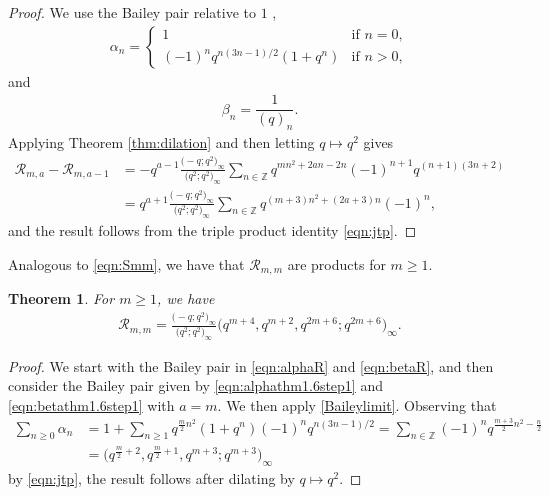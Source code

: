 \documentclass[pdftex]{sigma}
\newtheorem{Theorem}{Theorem}[section]
\numberwithin{equation}{section}
\newcommand{\ZZ}{\mathbb{Z}}
\begin{document}
\begin{proof}
We use the Bailey pair relative to $1$ \cite[p.~468, B(1)]{Sl1},
\begin{align}
	\alpha_n=
	\begin{cases}
		1 & \text{if $n=0$},\\
		(-1)^nq^{n(3n-1)/2}(1+q^n) & \text{if $n>0$},
	\end{cases}
	\label{eqn:alphaR}
\end{align}
and
\begin{align}
	\beta_n=\dfrac{1}{(q)_n}.
	\label{eqn:betaR}
\end{align}
Applying Theorem \ref{thm:dilation} and then letting $q \mapsto q^2$ gives
\begin{align*}
	\mathscr{R}_{m,a} - \mathscr{R}_{m,a-1} &{}= -q^{a-1}\frac{\bigl(-q;q^2\bigr)_{\infty}}{\bigl(q^2;q^2\bigr)_{\infty}}\sum_{n \in \mathbb{Z}} q^{mn^2+2an-2n}(-1)^{n+1}q^{(n+1)(3n+2)} \\
	&{}= q^{a+1}\frac{\bigl(-q;q^2\bigr)_{\infty}}{\bigl(q^2;q^2\bigr)_{\infty}}\sum_{n \in \mathbb{Z}} q^{(m+3)n^2+(2a+3)n}(-1)^{n},
\end{align*}
and the result follows from the triple product identity \eqref{eqn:jtp}.
\end{proof}
Analogous to \eqref{eqn:Smm}, we have that $\mathscr{R}_{m,m}$ are products for $m\geq 1$.
\begin{Theorem}
For $m\geq 1$, we have
\begin{align*}	
	\mathscr{R}_{m,m}=\frac{\bigl(-q;q^2\bigr)_{\infty}}{\bigl(q^2;q^2\bigr)_{\infty}}\bigl(q^{m+4},q^{m+2},q^{2m+6};q^{2m+6}\bigr)_{\infty}.
\end{align*}
\end{Theorem}
\begin{proof}
We start with the Bailey pair in \eqref{eqn:alphaR} and \eqref{eqn:betaR}, and then consider the Bailey pair given by \eqref{eqn:alphathm1.6step1} and \eqref{eqn:betathm1.6step1} with $a=m$. We then apply \eqref{Baileylimit}. Observing that
\begin{align*}
	\sum_{n\geq 0} \alpha_n &{}=1+ \sum_{n\geq 1} q^{\frac{m}{2}n^2}(1+q^n)(-1)^nq^{n(3n-1)/2}
	 =\sum_{n\in\ZZ}(-1)^n q^{\frac{m+3}{2}n^2-\frac{n}{2}} \\
	&{}=\bigl(q^{\frac{m}{2} +2},q^{\frac{m}{2} +1},q^{m+3};q^{m+3}\bigr)_\infty
\end{align*}
by \eqref{eqn:jtp}, the result follows after dilating by $q\mapsto q^2$.
\end{proof}
\end{document}
